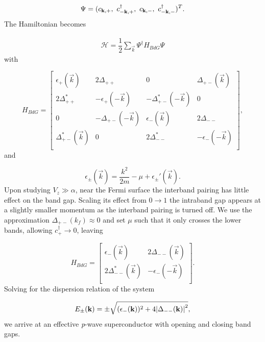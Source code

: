 \begin{align}
  \Psi = (c_{\vec{k},+},\ \cc_{-\vec{k},+},\ c_{\vec{k},-},\ \cc_{-\vec{k},-} )^T.
\end{align}
The Hamiltonian becomes

\begin{align}
  \mathcal{H} = \dfrac{1}{2}\sum_{\vec{k}} \Psi^{\dagger}H_{BdG}\Psi
\end{align}
with

\begin{equation}
  H_{BdG} =
  \begin{bmatrix}
    \epsilon_+(\vec{k}) & 2\Delta_{++} & 0 & \Delta_{+-}(\vec{k}) \\
    2\Delta_{++}^* & -\epsilon_+(-\vec{k}) & -\Delta_{+-}^*(-\vec{k}) & 0 \\
    0 & -\Delta_{+-}(-\vec{k}) & \epsilon_-(\vec{k}) & 2\Delta_{- -} \\
    \Delta_{+-}^*(\vec{k}) & 0 & 2\Delta_{- -}^* & -\epsilon_-(-\vec{k}) \\
  \end{bmatrix},
\end{equation}
and

\begin{equation}
  \epsilon_{\pm}(\vec{k}) = \dfrac{k^2}{2m} - \mu + \epsilon_{\pm}'(\vec{k}).
\end{equation}
Upon studying $V_z \gg \alpha$, near the Fermi surface the interband pairing has little effect on the band gap.
Scaling its effect from $0 \to 1$ the intraband gap appears at a slightly smaller momentum as the interband pairing is turned off.
We use the approximation $\Delta_{+-}(k_f) \approx 0$ and set $\mu$ such that it only crosses the lower bands, allowing $c_+^{\dagger} \to 0$, leaving

\begin{equation}
  H_{BdG} =
  \begin{bmatrix}
    \epsilon_-(\vec{k}) & 2\Delta_{- -}(\vec{k}) \\
    2\Delta_{- -}^*(\vec{k}) & -\epsilon_-(-\vec{k}) \\
  \end{bmatrix}.
\end{equation}
Solving for the dispersion relation of the system

\begin{align}
  E_{\pm}(\mathbf{k}) = \pm \sqrt{(\epsilon_-(\mathbf{k}))^2+4\abs{\Delta_{- -}(\mathbf{k})}^2},
\end{align}
 we arrive at an effective \textit{p}-wave superconductor with opening and closing band gaps.
